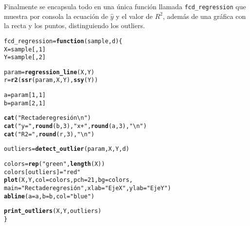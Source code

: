 \documentclass[12pt]{report}\usepackage[]{graphicx}\usepackage[dvipsnames]{xcolor}
\makeatletter
\newcommand{\hlnum}[1]{\textcolor[rgb]{0.686,0.059,0.569}{#1}}%
\newcommand{\hlstr}[1]{\textcolor[rgb]{0.192,0.494,0.8}{#1}}%
\newcommand{\hlstd}[1]{\textcolor[rgb]{0.345,0.345,0.345}{#1}}%
\newcommand{\hlkwa}[1]{\textcolor[rgb]{0.161,0.373,0.58}{\textbf{#1}}}%
\newcommand{\hlkwb}[1]{\textcolor[rgb]{0.69,0.353,0.396}{#1}}%
\newcommand{\hlkwc}[1]{\textcolor[rgb]{0.333,0.667,0.333}{#1}}%
\newcommand{\hlkwd}[1]{\textcolor[rgb]{0.737,0.353,0.396}{\textbf{#1}}}%
\newenvironment{kframe}{%
 \def\at@end@of@kframe{}%
 \ifinner\ifhmode%
  \def\at@end@of@kframe{\end{minipage}}%
  \begin{minipage}{\columnwidth}%
 \fi\fi%
 \def\FrameCommand##1{\hskip\@totalleftmargin \hskip-\fboxsep
 \colorbox{shadecolor}{##1}\hskip-\fboxsep
     \hskip-\linewidth \hskip-\@totalleftmargin \hskip\columnwidth}%
 \MakeFramed {\advance\hsize-\width
   \@totalleftmargin\z@ \linewidth\hsize
   \@setminipage}}%
 {\par\unskip\endMakeFramed%
 \at@end@of@kframe}
\newenvironment{knitrout}{}{} %
\makeatother
\begin{document}
 				Finalmente se encapsula todo en una única función llamada \texttt{fcd\_regression} que muestra por consola la ecuación de $\hat{y}$ y el valor de $R^2$, además de una gráfica con la recta y los puntos, distinguiendo los outliers. 
 				
\begin{knitrout}
\color{fgcolor}\begin{kframe}
\begin{alltt}
\hlstd{fcd_regression} \hlkwb{=} \hlkwa{function}\hlstd{(}\hlkwc{sample}\hlstd{,} \hlkwc{d}\hlstd{) \{}
        \hlstd{X} \hlkwb{=} \hlstd{sample[,} \hlnum{1}\hlstd{]}
        \hlstd{Y} \hlkwb{=} \hlstd{sample[,} \hlnum{2}\hlstd{]}

        \hlstd{param} \hlkwb{=} \hlkwd{regression_line}\hlstd{(X, Y)}
        \hlstd{r} \hlkwb{=} \hlkwd{r2}\hlstd{(}\hlkwd{ssr}\hlstd{(param, X, Y),} \hlkwd{ssy}\hlstd{(Y))}

        \hlstd{a} \hlkwb{=} \hlstd{param[}\hlnum{1}\hlstd{,} \hlnum{1}\hlstd{]}
        \hlstd{b} \hlkwb{=} \hlstd{param[}\hlnum{2}\hlstd{,} \hlnum{1}\hlstd{]}

        \hlkwd{cat}\hlstd{(}\hlstr{"Recta de regresión\textbackslash{}n"}\hlstd{)}
        \hlkwd{cat}\hlstd{(}\hlstr{"y ="}\hlstd{,} \hlkwd{round}\hlstd{(b,} \hlnum{3}\hlstd{),} \hlstr{"x +"}\hlstd{,} \hlkwd{round}\hlstd{(a,} \hlnum{3}\hlstd{),} \hlstr{"\textbackslash{}n"}\hlstd{)}
        \hlkwd{cat}\hlstd{(}\hlstr{"R2 ="}\hlstd{,} \hlkwd{round}\hlstd{(r,} \hlnum{3}\hlstd{),} \hlstr{"\textbackslash{}n"}\hlstd{)}

        \hlstd{outliers} \hlkwb{=} \hlkwd{detect_outlier}\hlstd{(param, X, Y, d)}

        \hlstd{colors} \hlkwb{=} \hlkwd{rep}\hlstd{(}\hlstr{"green"}\hlstd{,} \hlkwd{length}\hlstd{(X))}
        \hlstd{colors[outliers]} \hlkwb{=} \hlstr{"red"}
        \hlkwd{plot}\hlstd{(X, Y,} \hlkwc{col}\hlstd{=colors,} \hlkwc{pch}\hlstd{=}\hlnum{21}\hlstd{,} \hlkwc{bg}\hlstd{=colors,}
                \hlkwc{main}\hlstd{=}\hlstr{"Recta de regresión"}\hlstd{,} \hlkwc{xlab}\hlstd{=}\hlstr{"Eje X"}\hlstd{,} \hlkwc{ylab}\hlstd{=}\hlstr{"Eje Y"}\hlstd{)}
        \hlkwd{abline}\hlstd{(}\hlkwc{a}\hlstd{=a,} \hlkwc{b}\hlstd{=b,} \hlkwc{col}\hlstd{=}\hlstr{"blue"}\hlstd{)}

        \hlkwd{print_outliers}\hlstd{(X, Y, outliers)}
\hlstd{\}}
\end{alltt}
\end{kframe}
\end{knitrout}
 				
\end{document}
